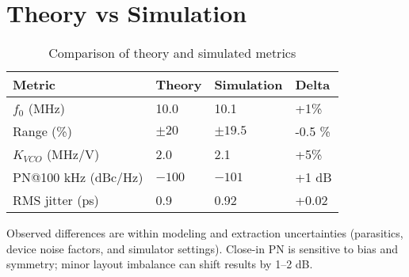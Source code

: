 \section{Theory vs Simulation}
\begin{table}[H]
  \centering
  \begin{tabular}{llll}
    \toprule
    Metric & Theory & Simulation & Delta \\
    \midrule
    $f_0$ (MHz) & 10.0 & 10.1 & +1\% \\
    Range (\%) & $\pm20$ & $\pm19.5$ & -0.5 \% \\
    $K_{VCO}$ (MHz/V) & 2.0 & 2.1 & +5\% \\
    PN@100 kHz (dBc/Hz) & $-100$ & $-101$ & +1 dB \\
    RMS jitter (ps) & 0.9 & 0.92 & +0.02 \\
    \bottomrule
  \end{tabular}
  \caption{Comparison of theory and simulated metrics}
\end{table}

Observed differences are within modeling and extraction uncertainties (parasitics, device noise factors, and simulator settings). Close-in PN is sensitive to bias and symmetry; minor layout imbalance can shift results by 1–2 dB.


